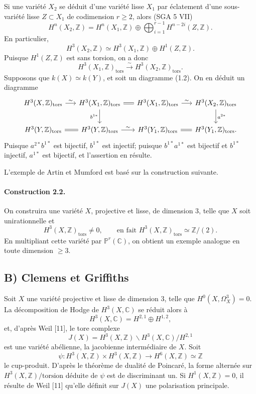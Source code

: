 \documentclass[10pt]{article}
\newcommand{\C}{\mathbb C}
\newcommand{\Pj}{\mathbb P}
\newcommand{\Z}{\mathbb Z}
\newcommand{\tors}{\operatorname{tors}}
\newcommand{\iso}{\xrightarrow{\sim}}
\begin{document}
Si une variété \(X_2\) se déduit d'une variété lisse \(X_1\) par éclatement d'une sous-variété lisse \(Z\subset X_1\) de codimension \(r\ge2\), alors (SGA 5 VII)
\[
H^n(X_2,\Z)=H^n(X_1,\Z)\oplus\bigoplus_{i=1}^{r-1}H^{n-2i}(Z,\Z).
\]
En particulier,
\[
H^3(X_2,\Z)\simeq H^3(X_1,\Z)\oplus H^1(Z,\Z).
\]
Puisque \(H^1(Z,\Z)\) est sans torsion, on a donc
\[
H^3(X_1,\Z)_{\tors}\iso H^3(X_2,\Z)_{\tors}.
\]
Supposons que \(k(X)\simeq k(Y)\), et soit un diagramme (1.2). On en déduit un diagramme
\[
\begin{tikzcd}[column sep=1.5em,row sep=2.0em]
H^3(X,\Z)_{\tors}\arrow[r,"\sim"]&H^3(X_1,\Z)_{\tors}\arrow[r,equal]\arrow[d,"b^{1*}"']&H^3(X_1,\Z)_{\tors}\arrow[r,"\sim"]&H^3(X_2,\Z)_{\tors}\arrow[d,"a^{2*}"]\\
H^3(Y,\Z)_{\tors}\arrow[r,equal]&H^3(Y,\Z)_{\tors}\arrow[r,"\sim"]&H^3(Y_1,\Z)_{\tors}\arrow[r,equal]&H^3(Y_1,\Z)_{\tors}.
\end{tikzcd}
\]
Puisque \(a^{2*}b^{1*}\) est bijectif, \(b^{1*}\) est injectif; puisque \(b^{1*}a^{1*}\) est bijectif et \(b^{1*}\) injectif, \(a^{1*}\) est bijectif, et l'assertion en résulte.

L'exemple de Artin et Mumford est basé sur la construction suivante.

\paragraph{Construction 2.2.} On construira une variété \(X\), projective et lisse, de dimension \(3\), telle que \(X\) soit unirationnelle et
\[
H^3(X,\Z)_{\tors}\ne0,
\qquad\text{en fait }H^3(X,\Z)_{\tors}\simeq\Z/(2).
\]
En multipliant cette variété par \(\Pj^r(\C)\), on obtient un exemple analogue en toute dimension \(\ge3\).

\subsection*{B) Clemens et Griffiths}

Soit \(X\) une variété projective et lisse de dimension \(3\), telle que \(H^0(X,\Omega_X^3)=0\). La décomposition de Hodge de \(H^3(X,\C)\) se réduit alors à
\[
H^3(X,\C)=H^{2,1}\oplus H^{1,2},
\]
et, d'après Weil [11], le tore complexe
\[
J(X)=H^3(X,\Z)\backslash H^3(X,\C)/H^{2,1}
\]
est une variété abélienne, la jacobienne intermédiaire de \(X\). Soit
\[
\psi:H^3(X,\Z)\times H^3(X,\Z)\longrightarrow H^6(X,\Z)\simeq\Z
\]
le cup-produit. D'après le théorème de dualité de Poincaré, la forme alternée sur \(H^3(X,\Z)/\text{torsion}\) déduite de \(\psi\) est de discriminant un. Si \(H^1(X,\Z)=0\), il résulte de Weil [11] qu'elle définit sur \(J(X)\) une polarisation principale.
\end{document}
